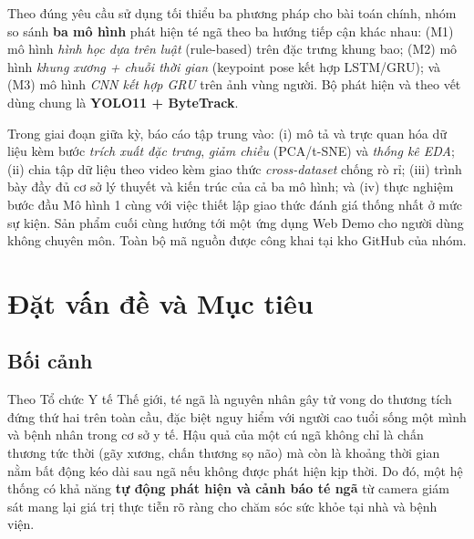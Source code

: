 \documentclass[fontsize=13pt,a4paper,oneside,DIV=calc,chapterprefix=true]{scrbook}
\begin{document}
Theo đúng yêu cầu sử dụng tối thiểu ba phương pháp cho bài toán chính, nhóm so sánh \textbf{ba mô hình} phát hiện té ngã theo ba hướng tiếp cận khác nhau: (M1) mô hình \textit{hình học dựa trên luật} (rule-based) trên đặc trưng khung bao; (M2) mô hình \textit{khung xương + chuỗi thời gian} (keypoint pose kết hợp LSTM/GRU); và (M3) mô hình \textit{CNN kết hợp GRU} trên ảnh vùng người. Bộ phát hiện và theo vết dùng chung là \textbf{YOLO11 + ByteTrack}.

Trong giai đoạn giữa kỳ, báo cáo tập trung vào: (i) mô tả và trực quan hóa dữ liệu kèm bước \textit{trích xuất đặc trưng}, \textit{giảm chiều} (PCA/t-SNE) và \textit{thống kê EDA}; (ii) chia tập dữ liệu theo video kèm giao thức \textit{cross-dataset} chống rò rỉ; (iii) trình bày đầy đủ cơ sở lý thuyết và kiến trúc của cả ba mô hình; và (iv) thực nghiệm bước đầu Mô hình 1 cùng với việc thiết lập giao thức đánh giá thống nhất ở mức sự kiện. Sản phẩm cuối cùng hướng tới một ứng dụng Web Demo cho người dùng không chuyên môn. Toàn bộ mã nguồn được công khai tại kho GitHub của nhóm.

\tableofcontents
\listoffigures
\listoftables

\mainmatter

\fancyhead{}
\fancyfoot[C]{\thepage}
\renewcommand{\headrulewidth}{0.4pt}
\renewcommand{\footrulewidth}{0.4pt}
\pagestyle{fancy}

\chapter{Đặt vấn đề và Mục tiêu}
\label{chap:intro}

\section{Bối cảnh}
Theo Tổ chức Y tế Thế giới, té ngã là nguyên nhân gây tử vong do thương tích đứng thứ hai trên toàn cầu, đặc biệt nguy hiểm với người cao tuổi sống một mình và bệnh nhân trong cơ sở y tế. Hậu quả của một cú ngã không chỉ là chấn thương tức thời (gãy xương, chấn thương sọ não) mà còn là khoảng thời gian nằm bất động kéo dài sau ngã nếu không được phát hiện kịp thời. Do đó, một hệ thống có khả năng \textbf{tự động phát hiện và cảnh báo té ngã} từ camera giám sát mang lại giá trị thực tiễn rõ ràng cho chăm sóc sức khỏe tại nhà và bệnh viện.
\end{document}
